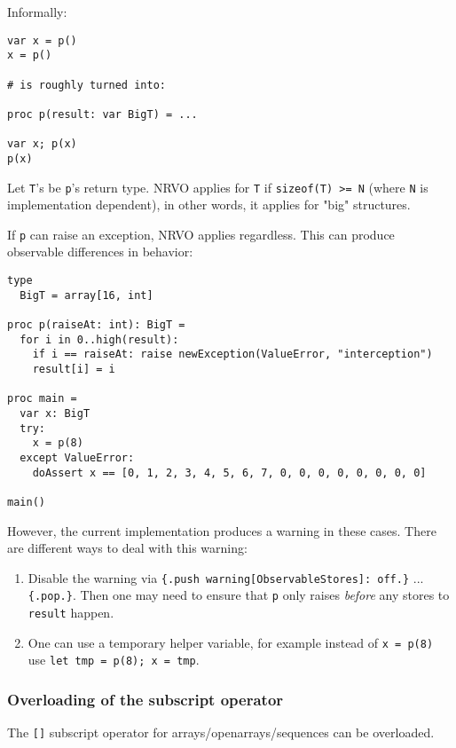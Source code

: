 Informally:

\begin{verbatim}
var x = p()
x = p()

# is roughly turned into:

proc p(result: var BigT) = ...

var x; p(x)
p(x)
\end{verbatim}

Let \texttt{T}'s be \texttt{p}'s return type. NRVO applies for
\texttt{T} if \texttt{sizeof(T)\ \textgreater{}=\ N} (where \texttt{N}
is implementation dependent), in other words, it applies for "big"
structures.

If \texttt{p} can raise an exception, NRVO applies regardless. This can
produce observable differences in behavior:

\begin{verbatim}
type
  BigT = array[16, int]

proc p(raiseAt: int): BigT =
  for i in 0..high(result):
    if i == raiseAt: raise newException(ValueError, "interception")
    result[i] = i

proc main =
  var x: BigT
  try:
    x = p(8)
  except ValueError:
    doAssert x == [0, 1, 2, 3, 4, 5, 6, 7, 0, 0, 0, 0, 0, 0, 0, 0]

main()
\end{verbatim}

However, the current implementation produces a warning in these cases.
There are different ways to deal with this warning:

\begin{enumerate}
\def\labelenumi{\arabic{enumi}.}
\tightlist
\item
  Disable the warning via
  \texttt{\{.push\ warning{[}ObservableStores{]}:\ off.\}} ...
  \texttt{\{.pop.\}}. Then one may need to ensure that \texttt{p} only
  raises \emph{before} any stores to \texttt{result} happen.
\item
  One can use a temporary helper variable, for example instead of
  \texttt{x\ =\ p(8)} use \texttt{let\ tmp\ =\ p(8);\ x\ =\ tmp}.
\end{enumerate}

\hypertarget{overloading-of-the-subscript-operator}{%
\subsubsection{Overloading of the subscript
operator}\label{overloading-of-the-subscript-operator}}

The \texttt{{[}{]}} subscript operator for arrays/openarrays/sequences
can be overloaded.

